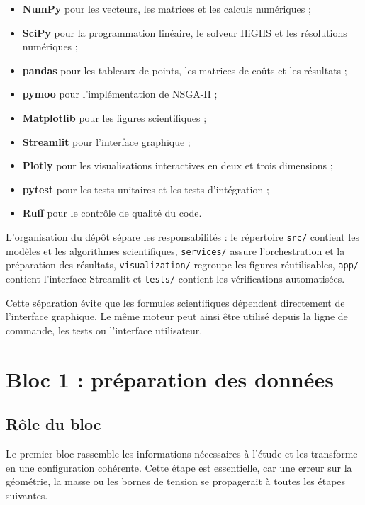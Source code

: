 \begin{itemize}
\item \textbf{NumPy} pour les vecteurs, les matrices et les calculs numériques ;
\item \textbf{SciPy} pour la programmation linéaire, le solveur HiGHS et les résolutions numériques ;
\item \textbf{pandas} pour les tableaux de points, les matrices de coûts et les résultats ;
\item \textbf{pymoo} pour l'implémentation de NSGA-II ;
\item \textbf{Matplotlib} pour les figures scientifiques ;
\item \textbf{Streamlit} pour l'interface graphique ;
\item \textbf{Plotly} pour les visualisations interactives en deux et trois dimensions ;
\item \textbf{pytest} pour les tests unitaires et les tests d'intégration ;
\item \textbf{Ruff} pour le contrôle de qualité du code.
\end{itemize}

L'organisation du dépôt sépare les responsabilités : le répertoire \texttt{src/} contient les modèles et les algorithmes scientifiques, \texttt{services/} assure l'orchestration et la préparation des résultats, \texttt{visualization/} regroupe les figures réutilisables, \texttt{app/} contient l'interface Streamlit et \texttt{tests/} contient les vérifications automatisées.

Cette séparation évite que les formules scientifiques dépendent directement de l'interface graphique. Le même moteur peut ainsi être utilisé depuis la ligne de commande, les tests ou l'interface utilisateur.

\section{Bloc 1 : préparation des données}
\label{sec:bloc_preparation}

\subsection{Rôle du bloc}

Le premier bloc rassemble les informations nécessaires à l'étude et les transforme en une configuration cohérente. Cette étape est essentielle, car une erreur sur la géométrie, la masse ou les bornes de tension se propagerait à toutes les étapes suivantes.

